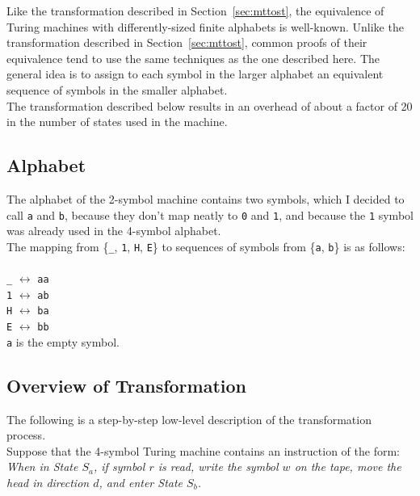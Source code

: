 \documentclass{report}
\begin{document}
Like the transformation described in Section~\ref{sec:mttost}, the equivalence of Turing machines with differently-sized finite alphabets is well-known. Unlike the transformation described in Section~\ref{sec:mttost}, common proofs of their equivalence tend to use the same techniques as the one described here. The general idea is to assign to each symbol in the larger alphabet an equivalent sequence of symbols in the smaller alphabet. \\

The transformation described below results in an overhead of about a factor of 20 in the number of states used in the machine.

\subsection{Alphabet}

The alphabet of the 2-symbol machine contains two symbols, which I decided to call \texttt{a} and \texttt{b}, because they don't map neatly to \texttt{0} and \texttt{1}, and because the \texttt{1} symbol was already used in the 4-symbol alphabet. \\

The mapping from \{\texttt{\_}, \texttt{1}, \texttt{H}, \texttt{E}\} to sequences of symbols from \{\texttt{a}, \texttt{b}\} is as follows: \\ \\
\texttt{\_} $\leftrightarrow$ \texttt{aa} \\
\texttt{1} $\leftrightarrow$ \texttt{ab} \\
\texttt{H} $\leftrightarrow$ \texttt{ba} \\
\texttt{E} $\leftrightarrow$ \texttt{bb} \\

\texttt{a} is the empty symbol.

\subsection{Overview of Transformation}

The following is a step-by-step low-level description of the transformation process. \\

Suppose that the 4-symbol Turing machine contains an instruction of the form: \\

\emph{When in State $S_a$, if symbol $r$ is read, write the symbol $w$ on the tape, move the head in direction $d$, and enter State $S_b$.} \\
\end{document}
